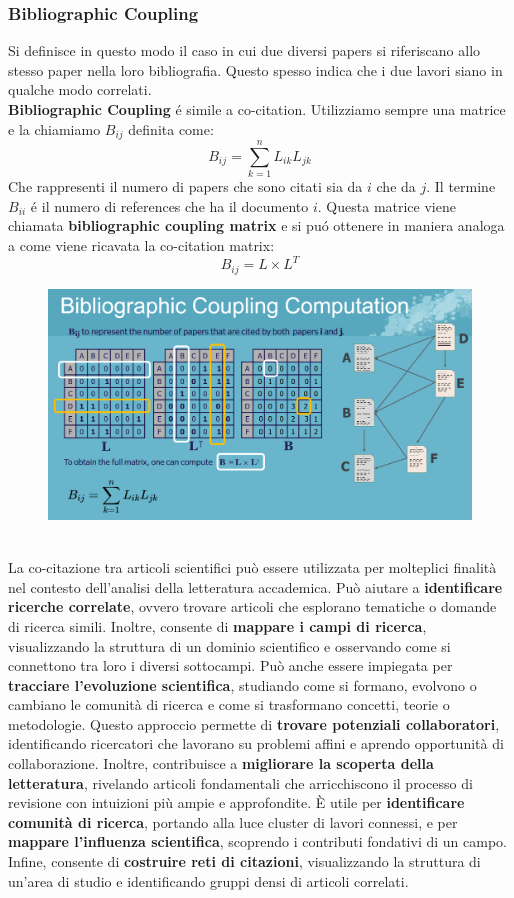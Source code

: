 \subsubsection*{Bibliographic Coupling}
Si definisce in questo modo il caso in cui due diversi papers si riferiscano allo stesso paper nella loro bibliografia. Questo spesso indica che i due lavori siano in qualche modo correlati. 
\\
\textbf{Bibliographic Coupling} é simile a co-citation. Utilizziamo sempre una matrice e la chiamiamo $B_{ij}$ definita come:
\[
B_{ij} = \sum_{k=1}^{n} L_{ik} L_{jk}
\]
Che rappresenti il numero di papers che sono citati sia da $i$ che da $j$. Il termine $B_{ii}$ é il numero di references che ha il documento $i$. Questa matrice viene chiamata \textbf{bibliographic coupling matrix} e si puó ottenere in maniera analoga a come viene ricavata la co-citation matrix:
\[
B_{ij} = L \times L^T
\]
\begin{figure}[th]
    \centering
    \includegraphics[scale=0.2]{GraphImportance//img/bibliocoupling.png}
\end{figure}
\\
La co-citazione tra articoli scientifici può essere utilizzata per molteplici finalità nel contesto dell'analisi della letteratura accademica. Può aiutare a \textbf{identificare ricerche correlate}, ovvero trovare articoli che esplorano tematiche o domande di ricerca simili. Inoltre, consente di \textbf{mappare i campi di ricerca}, visualizzando la struttura di un dominio scientifico e osservando come si connettono tra loro i diversi sottocampi. Può anche essere impiegata per \textbf{tracciare l'evoluzione scientifica}, studiando come si formano, evolvono o cambiano le comunità di ricerca e come si trasformano concetti, teorie o metodologie. Questo approccio permette di \textbf{trovare potenziali collaboratori}, identificando ricercatori che lavorano su problemi affini e aprendo opportunità di collaborazione. Inoltre, contribuisce a \textbf{migliorare la scoperta della letteratura}, rivelando articoli fondamentali che arricchiscono il processo di revisione con intuizioni più ampie e approfondite. È utile per \textbf{identificare comunità di ricerca}, portando alla luce cluster di lavori connessi, e per \textbf{mappare l'influenza scientifica}, scoprendo i contributi fondativi di un campo. Infine, consente di \textbf{costruire reti di citazioni}, visualizzando la struttura di un'area di studio e identificando gruppi densi di articoli correlati.

